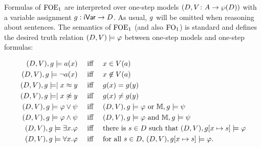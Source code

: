 
Formulas of $\mathrm{FOE}_1$ are interpreted over one-step models $(D,V \colon A \to \wp(D))$ with a variable assignment $g: \mathsf{iVar} \to D$. As usual, $g$ will be omitted when reasoning about sentences. The semantics of $\mathrm{FOE}_1$ (and also $\mathrm{FO}_1$) is standard and defines the desired truth relation $(D, V) \models \varphi$ between one-step models and one-step formulas:
%

\begin{align*}
(D, \val),\ass \models a(x) & \quad\text{ iff }\quad  x \in \val(a) \\
(D, \val),\ass \models \lnot a(x) & \quad\text{ iff }\quad  x \not\in \val(a) \\
(D, \val),\ass \models \mid x \foeq y & \quad\text{ iff }\quad \ass(x) = \ass(y) \\
(D, \val),\ass \models \mid x \not\foeq y & \quad\text{ iff }\quad \ass(x) \neq \ass(y) \\
(D, \val),\ass \models \varphi\lor\psi & \quad\text{ iff }\quad  (D, \val),\ass \models \varphi \text{ or } \npmodel,\ass \models \psi \\
(D, \val),\ass \models \varphi\land\psi & \quad\text{ iff }\quad  (D, \val),\ass \models \varphi \text{ and } \npmodel,\ass \models \psi \\
(D, \val),\ass \models \exists x.\varphi & \quad\text{ iff }\quad  \text{there is $s \in D$ such that $(D, \val), \ass[x\mapsto s] \models \varphi$}\\
(D, \val),\ass \models \forall x.\varphi & \quad\text{ iff }\quad  \text{for all $s \in D$, } (D, \val), \ass[x\mapsto s] \models \varphi.
\end{align*}


